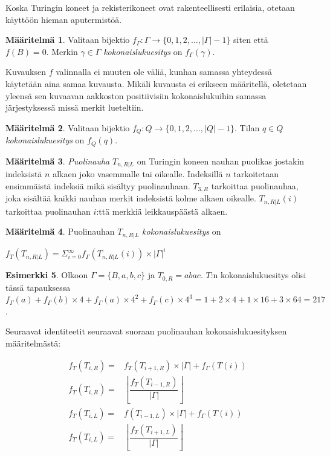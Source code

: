 \documentclass[a4paper, 12pt]{article}
\theoremstyle{definition}
\newtheorem{mydef}{Määritelmä}
\newtheorem{example}[mydef]{Esimerkki}
\theoremstyle{plain}
\begin{document}
Koska Turingin koneet ja rekisterikoneet ovat rakenteellisesti erilaisia, otetaan käyttöön hieman aputermistöä.

\begin{mydef}
\label{def:fgamma}
Valitaan bijektio $f_\Gamma : \Gamma \rightarrow \{0, 1, 2, \ldots, |\Gamma| - 1\}$ siten että $f(B) = 0$. Merkin $\gamma \in \Gamma$ \emph{kokonaislukuesitys} on $f_\Gamma(\gamma)$.
\end{mydef}
Kuvauksen $f$ valinnalla ei muuten ole väliä, kunhan samassa yhteydessä käytetään aina samaa kuvausta. Mikäli kuvausta ei erikseen määritellä, oletetaan yleensä sen kuvaavan aakkoston positiivisiin kokonaislukuihin samassa järjestyksessä missä merkit lueteltiin.

\begin{mydef}
\label{def:fq}
Valitaan bijektio $f_Q : Q \rightarrow \{0, 1, 2, \ldots, |Q| - 1\}$. Tilan $q \in Q$ \emph{kokonaislukuesitys} on $f_Q(q)$.
\end{mydef}

\begin{mydef}
\emph{Puolinauha} $T_{n, R | L}$ on Turingin koneen nauhan puolikas jostakin indeksistä $n$ alkaen joko vasemmalle tai oikealle. Indeksillä $n$ tarkoitetaan ensimmäistä indeksiä mikä sisältyy puolinauhaan. $T_{3, R}$ tarkoittaa puolinauhaa, joka sisältää kaikki nauhan merkit indeksistä kolme alkaen oikealle. $T_{n, R | L}(i)$ tarkoittaa puolinauhan $i$:ttä merkkiä leikkauspäästä alkaen.
\end{mydef}

\begin{mydef}
Puolinauhan $T_{n, R | L}$ \emph{kokonaislukuesitys} on 
\begin{center}
\begin{math}
f_T(T_{n, R | L}) = \Sigma_{i=0}^{\infty} f_\Gamma(T_{n, R | L}(i)) \times |\Gamma|^i
\end{math}
\end{center}
\end{mydef}

\begin{example}
Olkoon $\Gamma = \{B, a, b, c\}$ ja $T_{0, R} = abac$. $T$:n kokonaislukuesitys olisi tässä tapauksessa $f_\Gamma(a) + f_\Gamma(b) \times 4 + f_\Gamma(a) \times 4^2 + f_\Gamma(c) \times 4^3= 1 + 2 \times 4 + 1 \times 16 + 3 \times 64 = 217$.
\end{example}

Seuraavat identiteetit seuraavat suoraan puolinauhan kokonaislukuesityksen määritelmästä:
\begin{center}
\begin{align*}
f_T(T_{i,R}) =& f_T(T_{i+1,R}) \times |\Gamma| + f_\Gamma(T(i))\\
f_T(T_{i,R}) =& \left\lfloor\dfrac{f_T(T_{i-1, R})}{|\Gamma|}\right\rfloor \\
f_T(T_{i,L}) =& f(T_{i-1,L}) \times |\Gamma| + f_\Gamma(T(i)) \\
f_T(T_{i,L}) =& \left\lfloor\dfrac{f_T(T_{i+1, L})}{|\Gamma|}\right\rfloor \\
\end{align*}
\end{center}
\end{document}
